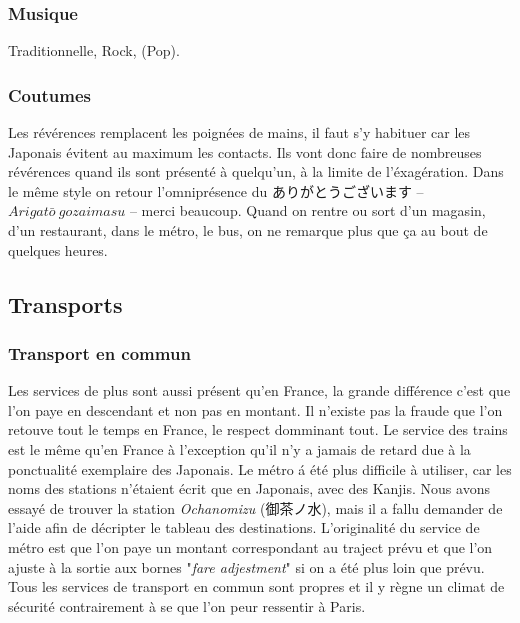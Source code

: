 \documentclass[journal]{RapportFR}
\begin{document}
\begin{CJK*}{UTF8}{min}
\subsubsection{Musique}

Traditionnelle,
Rock,
(Pop).

\subsubsection{Coutumes}

Les r\'ev\'erences remplacent les poign\'ees de mains, il faut s'y habituer car les Japonais \'evitent au maximum les contacts. Ils vont donc faire de nombreuses r\'ev\'erences quand ils sont pr\'esent\'e \`a quelqu'un, \`a la limite de l'\'exag\'eration. Dans le m\^eme style on retour l'omnipr\'esence du ありがとうございます -- $Arigat\bar{o}~ gozaimasu$ -- merci beaucoup. Quand on rentre ou sort d'un magasin, d'un restaurant, dans le m\'etro, le bus, on ne remarque plus que \c{c}a au bout de quelques heures.

\subsection{Transports}

\subsubsection{Transport en commun}

Les services de plus sont aussi pr\'esent qu'en France, la grande diff\'erence c'est que l'on paye en descendant et non pas en montant. Il n'existe pas la fraude que l'on retouve tout le temps en France, le respect domminant tout.
Le service des trains est le m\^eme qu'en France \`a l'exception qu'il n'y a jamais de retard due \`a la ponctualit\'e exemplaire des Japonais.
Le m\'etro \'a \'et\'e plus difficile \`a utiliser, car les noms des stations n'\'etaient \'ecrit que en Japonais, avec des Kanjis. Nous avons essay\'e de trouver la station \textit{Ochanomizu} (御茶ノ水), mais il a fallu demander de l'aide afin de d\'ecripter le tableau des destinations.
L'originalit\'e du service de m\'etro est que l'on paye un montant correspondant au traject pr\'evu et que l'on ajuste \`a la sortie aux bornes "\textit{fare adjestment}" si on a \'et\'e plus loin que pr\'evu.
Tous les services de transport en commun sont propres et il y r\`egne un climat de s\'ecurit\'e contrairement \`a se que l'on peur ressentir \`a Paris.


\end{CJK*}
\end{document}
